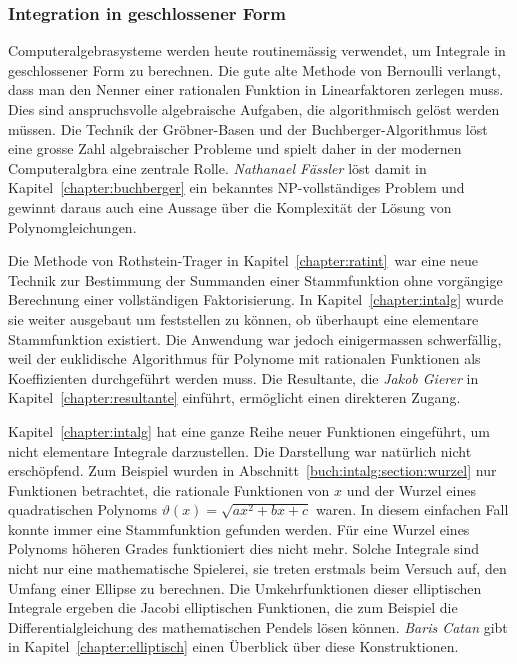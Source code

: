 %
%
\subsubsection{Integration in geschlossener Form}

%
%
Computeralgebrasysteme werden heute routinemässig verwendet, um
Integrale in geschlossener Form zu berechnen.
Die gute alte Methode von Bernoulli verlangt, dass man den Nenner
einer rationalen Funktion in Linearfaktoren zerlegen muss.
Dies sind anspruchsvolle algebraische Aufgaben, die algorithmisch
gelöst werden müssen.
Die Technik der Gröbner-Basen und der Buchberger-Algorithmus
löst eine grosse Zahl algebraischer Probleme und spielt daher in
der modernen Computeralgbra eine zentrale Rolle.
\emph{Nathanael Fässler}
%
%
löst damit in Kapitel~\ref{chapter:buchberger} ein bekanntes 
NP-vollständiges Problem und gewinnt daraus auch eine Aussage
über die Komplexität der Lösung von Polynomgleichungen.

%
%
Die Methode von Rothstein-Trager in Kapitel~\ref{chapter:ratint} war eine neue
Technik zur Bestimmung der Summanden einer Stammfunktion ohne vorgängige
Berechnung einer vollständigen Faktorisierung.
In Kapitel~\ref{chapter:intalg} wurde sie weiter ausgebaut um feststellen
zu können, ob überhaupt eine elementare Stammfunktion existiert. 
Die Anwendung war jedoch einigermassen schwerfällig, weil der 
euklidische Algorithmus für Polynome mit rationalen Funktionen als
Koeffizienten durchgeführt werden muss.
Die Resultante, die
\emph{Jakob Gierer}
%
%
in Kapitel~\ref{chapter:resultante} einführt, ermöglicht einen direkteren
Zugang.

%
%
Kapitel~\ref{chapter:intalg} hat eine ganze Reihe neuer
Funktionen eingeführt, um nicht elementare Integrale darzustellen.
Die Darstellung war natürlich nicht erschöpfend.
Zum Beispiel wurden in Abschnitt~\ref{buch:intalg:section:wurzel}
nur Funktionen betrachtet, die rationale Funktionen von $x$ und der
Wurzel eines quadratischen Polynoms $\vartheta(x)=\!\sqrt{ax^2+bx+c}$
waren.
In diesem einfachen Fall konnte immer eine Stammfunktion gefunden
werden.
Für eine Wurzel eines Polynoms höheren Grades funktioniert
dies nicht mehr.
Solche Integrale sind nicht nur eine mathematische Spielerei, sie
treten erstmals beim Versuch auf, den Umfang einer Ellipse zu berechnen.
Die Umkehrfunktionen dieser elliptischen Integrale ergeben die Jacobi
elliptischen Funktionen, die zum Beispiel die Differentialgleichung
des mathematischen Pendels lösen können.
\emph{Baris Catan}
%
%
gibt in Kapitel~\ref{chapter:elliptisch} einen Überblick über diese
Konstruktionen.


